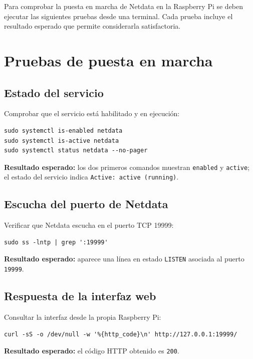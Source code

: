 Para comprobar la puesta en marcha de Netdata en la Raspberry Pi se deben
ejecutar las siguientes pruebas desde una terminal. Cada prueba incluye el
resultado esperado que permite considerarla satisfactoria.

\section{Pruebas de puesta en marcha}

\subsection{Estado del servicio}

Comprobar que el servicio está habilitado y en ejecución:

\begin{lstlisting}[style=terminal]
sudo systemctl is-enabled netdata
sudo systemctl is-active netdata
sudo systemctl status netdata --no-pager
\end{lstlisting}

\textbf{Resultado esperado:} los dos primeros comandos muestran
\texttt{enabled} y \texttt{active}; el estado del servicio indica
\texttt{Active: active (running)}.

\subsection{Escucha del puerto de Netdata}

Verificar que Netdata escucha en el puerto TCP 19999:

\begin{lstlisting}[style=terminal]
sudo ss -lntp | grep ':19999'
\end{lstlisting}

\textbf{Resultado esperado:} aparece una línea en estado \texttt{LISTEN}
asociada al puerto \texttt{19999}.

\subsection{Respuesta de la interfaz web}

Consultar la interfaz desde la propia Raspberry Pi:

\begin{lstlisting}[style=terminal]
curl -sS -o /dev/null -w '%{http_code}\n' http://127.0.0.1:19999/
\end{lstlisting}

\textbf{Resultado esperado:} el código HTTP obtenido es \texttt{200}.

